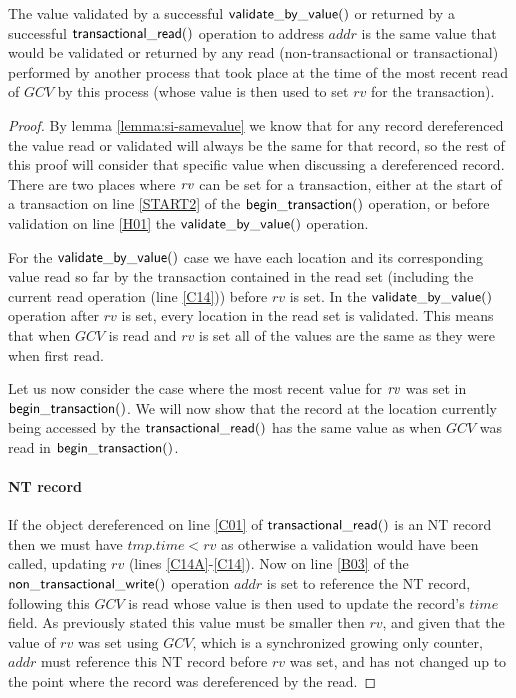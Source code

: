 \begin{lemma}
\label{lemma:si-rvvalid}
The value validated by a successful $\sf{validate\_by\_value}()$ or returned by a successful
$\sf{transactional\_read}()$ operation to address $\mathit{addr}$ is the same
value that would be validated or returned by any read (non-transactional or transactional) performed by another process that took place
at the time of the most recent read of $\mathit{GCV}$ by this process (whose value is then used to set $\mathit{rv}$ for the transaction).
\end{lemma}
\begin{proof}
By lemma \ref{lemma:si-samevalue} we know that for any record dereferenced the value read or validated will
always be the same for that record, so the rest of this proof will consider that specific value when discussing
a dereferenced record.
There are two places where $\ms{rv}$ can be set for a transaction, either at the start of a transaction on line \ref{START2} of the
$\sf{begin\_transaction}()$ operation, or before validation on line \ref{H01} the $\sf{validate\_by\_value}()$ operation.


For the $\sf{validate\_by\_value}()$ case we have each location and its corresponding value read so far by the transaction contained
in the read set (including the current read operation (line \ref{C14})) before $\mathit{rv}$ is set.
In the $\sf{validate\_by\_value}()$ operation after $\mathit{rv}$ is set, every location in the read set is
validated.
This means that when $\mathit{GCV}$ is read and $\mathit{rv}$ is set all of the values are the same as they were when first read.

Let us now consider the case where the most recent value for $\ms{rv}$ was set in $\sf{begin\_transaction}()$.
We will now show that the record at the location currently being accessed by the $\sf{transactional\_read}()$
has the same value as when $\mathit{GCV}$ was read in $\sf{begin\_transaction}()$.

\paragraph{NT record} If the object dereferenced on line \ref{C01} of $\sf{transactional\_read}()$ is an NT record then we must have $\mathit{tmp.time} < \mathit{rv}$
as otherwise a validation would have been called, updating $\mathit{rv}$ (lines \ref{C14A}-\ref{C14}).
Now on line \ref{B03} of the $\sf{non\_transactional\_write}()$ operation $\mathit{addr}$ is set to reference the NT record, following this
$\mathit{GCV}$ is read whose value is then used to update the record's $\mathit{time}$ field.
As previously stated this value must be smaller then $\mathit{rv}$, and given that the value of $\mathit{rv}$
was set using $\mathit{GCV}$, which is a synchronized growing only counter, $\mathit{addr}$ must reference
this NT record before $\mathit{rv}$ was set, and has not changed up to the point where the record was dereferenced by the read.


\end{proof}
